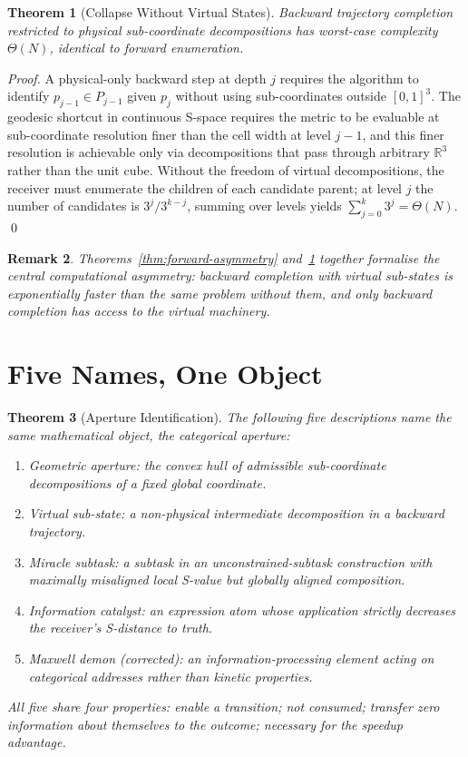 \documentclass[twocolumn,a4paper]{article}
\newtheorem{theorem}{Theorem}[section]
\newtheorem{remark}[theorem]{Remark}
\newcommand{\Real}{\mathbb{R}}
\begin{document}
\begin{theorem}[Collapse Without Virtual States]
\label{thm:collapse}
Backward trajectory completion restricted to physical sub-coordinate decompositions has worst-case complexity $\Theta(N)$, identical to forward enumeration.
\end{theorem}

\begin{proof}
A physical-only backward step at depth $j$ requires the algorithm to identify $p_{j-1}\in P_{j-1}$ given $p_{j}$ without using sub-coordinates outside $[0,1]^{3}$. The geodesic shortcut in continuous S-space requires the metric to be evaluable at sub-coordinate resolution finer than the cell width at level $j-1$, and this finer resolution is achievable only via decompositions that pass through arbitrary $\Real^{3}$ rather than the unit cube. Without the freedom of virtual decompositions, the receiver must enumerate the children of each candidate parent; at level $j$ the number of candidates is $3^{j}/3^{k-j}$, summing over levels yields $\sum_{j=0}^{k}3^{j}=\Theta(N)$. \qed
\end{proof}

\begin{remark}
Theorems~\ref{thm:forward-asymmetry} and~\ref{thm:collapse} together formalise the central computational asymmetry: backward completion with virtual sub-states is exponentially faster than the same problem without them, and only backward completion has access to the virtual machinery.
\end{remark}



\section{Five Names, One Object}
\label{sec:five-names}

\begin{theorem}[Aperture Identification]
\label{thm:five-names}
The following five descriptions name the same mathematical object, the \emph{categorical aperture}:
\begin{enumerate}[nosep,label=(\arabic*)]
\item Geometric aperture: the convex hull of admissible sub-coordinate decompositions of a fixed global coordinate.
\item Virtual sub-state: a non-physical intermediate decomposition in a backward trajectory.
\item Miracle subtask: a subtask in an unconstrained-subtask construction with maximally misaligned local S-value but globally aligned composition.
\item Information catalyst: an expression atom whose application strictly decreases the receiver's S-distance to truth.
\item Maxwell demon (corrected): an information-processing element acting on categorical addresses rather than kinetic properties.
\end{enumerate}
All five share four properties: enable a transition; not consumed; transfer zero information about themselves to the outcome; necessary for the speedup advantage.
\end{theorem}
\end{document}
